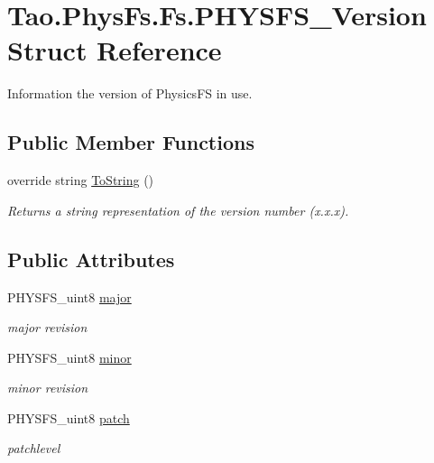 \hypertarget{struct_tao_1_1_phys_fs_1_1_fs_1_1_p_h_y_s_f_s___version}{
\section{Tao.PhysFs.Fs.PHYSFS\_\-Version Struct Reference}
\label{struct_tao_1_1_phys_fs_1_1_fs_1_1_p_h_y_s_f_s___version}
}


Information the version of PhysicsFS in use.  


\subsection*{Public Member Functions}
\begin{DoxyCompactItemize}
\item 
override string \hyperlink{struct_tao_1_1_phys_fs_1_1_fs_1_1_p_h_y_s_f_s___version_a735409f4c49eec4d9f4f013bbdf50257}{ToString} ()
\begin{DoxyCompactList}\small\item\em Returns a string representation of the version number (x.x.x). \item\end{DoxyCompactList}\end{DoxyCompactItemize}
\subsection*{Public Attributes}
\begin{DoxyCompactItemize}
\item 
PHYSFS\_\-uint8 \hyperlink{struct_tao_1_1_phys_fs_1_1_fs_1_1_p_h_y_s_f_s___version_a20c16599784a14b5b8f1a2c35e04bbce}{major}
\begin{DoxyCompactList}\small\item\em major revision \item\end{DoxyCompactList}\item 
PHYSFS\_\-uint8 \hyperlink{struct_tao_1_1_phys_fs_1_1_fs_1_1_p_h_y_s_f_s___version_a1927d1c2cd4b1e3d8009ccd0adf51568}{minor}
\begin{DoxyCompactList}\small\item\em minor revision \item\end{DoxyCompactList}\item 
PHYSFS\_\-uint8 \hyperlink{struct_tao_1_1_phys_fs_1_1_fs_1_1_p_h_y_s_f_s___version_a7079dd72e452e14910ecab20c75aafd0}{patch}
\begin{DoxyCompactList}\small\item\em patchlevel \item\end{DoxyCompactList}\end{DoxyCompactItemize}


